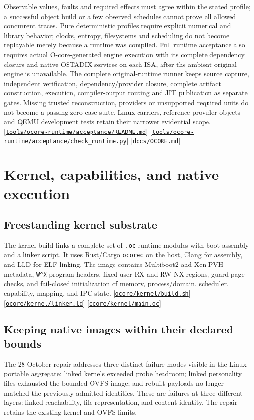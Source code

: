 \documentclass[11pt,oneside]{article}
\newcommand{\src}[1]{\textcolor{OSlate}{\scriptsize[\href{https://github.com/lostadi/OSTADIX/blob/c0b02c326b2329a95ba52447c7180bc93957cd57/#1}{\nolinkurl{#1}}]}\allowbreak}
\begin{document}
Observable values, faults and required effects must agree within the stated
profile; a successful object build or a few observed schedules cannot prove
all allowed concurrent traces. Pure deterministic
profiles require explicit numerical and library behavior; clocks, entropy,
filesystems and scheduling do not become replayable merely because a runtime
was compiled. Full runtime acceptance also requires actual O-core-generated
engine execution with its complete dependency closure and native OSTADIX
services on each ISA, after the ambient original engine is unavailable.
The complete original-runtime runner keeps source capture, independent
verification, dependency/provider closure, complete artifact construction,
execution, compiler-output routing and JIT publication as separate gates.
Missing trusted reconstruction, providers or unsupported required units do
not become a passing zero-case suite. Linux carriers, reference provider
objects and QEMU development tests retain their narrower evidential scope.
\src{tools/ocore-runtime/acceptance/README.md}
\src{tools/ocore-runtime/acceptance/check_runtime.py}
\src{docs/OCORE.md}

\section{Kernel, capabilities, and native execution}
\label{sec:kernel}

\subsection{Freestanding kernel substrate}

The kernel build links a complete set of \texttt{.oc} runtime modules with
boot assembly and a linker script. It uses Rust/Cargo \texttt{ocorec} on the
host, Clang for assembly, and LLD for ELF linking. The image contains
Multiboot2 and Xen PVH metadata, \texttt{W\textasciicircum X} program headers,
fixed user RX and RW-NX
regions, guard-page checks, and fail-closed initialization of memory,
process/domain, scheduler, capability, mapping, and IPC state.
\src{ocore/kernel/build.sh}
\src{ocore/kernel/linker.ld}
\src{ocore/kernel/main.oc}

\subsection{Keeping native images within their declared bounds}
\label{sec:image-repair}

The 28 October repair addresses three distinct failure modes visible in the
Linux portable aggregate: linked kernels exceeded probe headroom; linked
personality files exhausted the bounded OVFS image; and rebuilt payloads no
longer matched the previously admitted identities. These are failures at
three different layers: linked reachability, file representation, and content
identity. The repair retains the existing kernel and OVFS limits.
\end{document}
